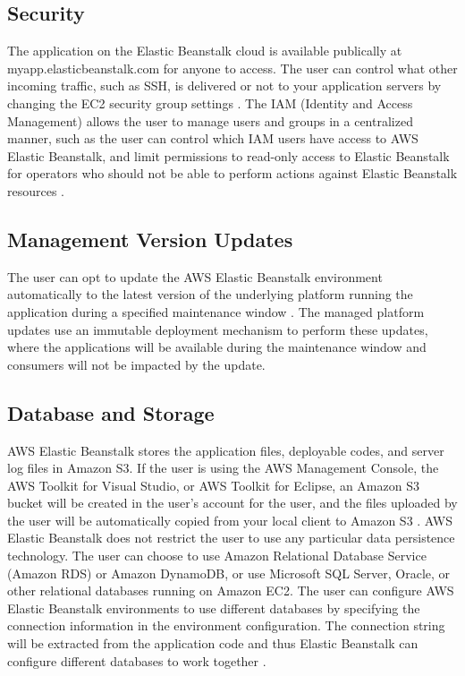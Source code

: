 \documentclass[9pt,twocolumn,twoside]{../../styles/osajnl}
\begin{document}
\subsection{Security}

The application on the Elastic Beanstalk cloud is available publically
at myapp.elasticbeanstalk.com for anyone to access. The user can
control what other incoming traffic, such as SSH, is delivered or not
to your application servers by changing the EC2 security group
settings \cite{elastic-faq}. The IAM (Identity and Access Management)
allows the user to manage users and groups in a centralized manner,
such as the user can control which IAM users have access to AWS
Elastic Beanstalk, and limit permissions to read-only access to
Elastic Beanstalk for operators who should not be able to perform
actions against Elastic Beanstalk resources \cite{elastic-faq}.

\subsection{Management Version Updates}

The user can opt to update the AWS Elastic Beanstalk environment
automatically to the latest version of the underlying platform running
the application during a specified maintenance window
\cite{elastic-faq}. The managed platform updates use an immutable
deployment mechanism to perform these updates, where the applications
will be available during the maintenance window and consumers will not
be impacted by the update.

\subsection{Database and Storage}

AWS Elastic Beanstalk stores the application files, deployable codes,
and server log files in Amazon S3. If the user is using the AWS
Management Console, the AWS Toolkit for Visual Studio, or AWS Toolkit
for Eclipse, an Amazon S3 bucket will be created in the user's account
for the user, and the files uploaded by the user will be automatically
copied from your local client to Amazon S3 \cite{elastic-faq}. AWS
Elastic Beanstalk does not restrict the user to use any particular
data persistence technology. The user can choose to use Amazon
Relational Database Service (Amazon RDS) or Amazon DynamoDB, or use
Microsoft SQL Server, Oracle, or other relational databases running on
Amazon EC2. The user can configure AWS Elastic Beanstalk environments
to use different databases by specifying the connection information in
the environment configuration. The connection string will be extracted
from the application code and thus Elastic Beanstalk can configure
different databases to work together \cite{elastic-faq}.
\end{document}
